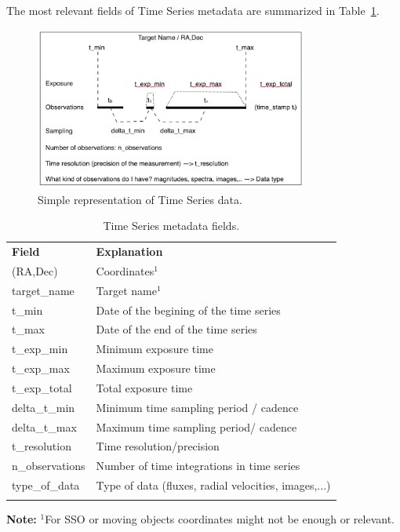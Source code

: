 \documentclass[11pt,a4paper]{ivoa}
\begin{document}
The most relevant fields of Time Series metadata are summarized in Table~\ref{tab:fields}.

\begin{figure}[hbt]

\begin{center}
  \includegraphics[width=0.8\textwidth]{figs/fig1.png}
\caption{Simple representation of Time Series data.}
\label{fig:time-series}
\end{center}
\end{figure}

\begin{table}[hb]
  \begin{center}
  \caption{Time Series metadata fields.}
  \label{tab:fields}
    \begin{tabular}{p{}p{}}
      \sptablerule
      \textbf{Field}  & \textbf{Explanation}                        \\\sptablerule
      (RA,Dec)        & Coordinates$^1$                             \\
      target\_name    & Target name$^1$                             \\
      t\_min          & Date of the begining of the time series  \\
      t\_max          & Date of the end of the time series          \\
      t\_exp\_min     & Minimum exposure time                       \\
      t\_exp\_max     & Maximum exposure time                       \\
      t\_exp\_total   & Total exposure time                         \\
      delta\_t\_min   & Minimum time sampling period / cadence             \\
      delta\_t\_max   & Maximum time sampling period/ cadence             \\
      t\_resolution   & Time resolution/precision                   \\
      n\_observations & Number of time integrations  in time series         \\
      type\_of\_data  & Type of data (fluxes, radial velocities, images,...)\\
      \sptablerule
    \end{tabular}
  \end{center}
  \textbf{Note:} $^1$For SSO or moving objects coordinates might not be enough or relevant.
\end{table}
\end{document}
